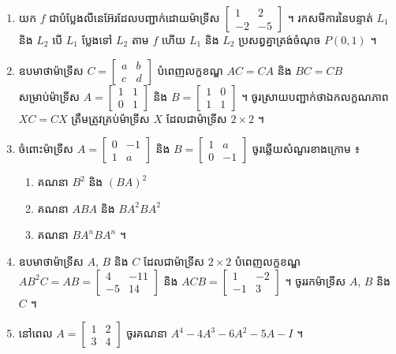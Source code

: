 \begin{enumerate}[1]
  \item យក $f$ ជាបំប្លែងលីនេអ៊ែរដែលបញ្ជាក់ដោយម៉ាទ្រីស $\begin{bmatrix} 1 & 2\\ -2 & -5 \end{bmatrix}$ ។ រកសមីការនៃបន្ទាត់ $L_1$ និង $L_2$ បើ $L_1$ ប្លែងទៅ $L_2$ តាម $f$ ហើយ $L_1$ និង $L_2$ ប្រសព្វគ្នាត្រង់ចំណុច $P(0, 1)$ ។
  \item ឧបមាថាម៉ាទ្រីស $C = \begin{bmatrix} a & b\\ c & d \end{bmatrix}$ បំពេញលក្ខខណ្ឌ $AC = CA$ និង $BC = CB$ សម្រាប់ម៉ាទ្រីស $A = \begin{bmatrix} 1 & 1\\ 0 & 1 \end{bmatrix}$ និង $B = \begin{bmatrix} 1 & 0\\ 1 & 1 \end{bmatrix}$ ។ ចូរស្រាយបញ្ជាក់ថាឯកលក្ខណភាព $XC = CX$ ត្រឹមត្រូវគ្រប់ម៉ាទ្រីស $X$ ដែលជាម៉ាទ្រីស $2\times 2$ ។
  \item ចំពោះម៉ាទ្រីស $A = \begin{bmatrix} 0 & -1\\ 1 & a \end{bmatrix}$ និង $B = \begin{bmatrix} 1 & a\\ 0 & -1 \end{bmatrix}$ ចូរឆ្លើយសំណួរខាងក្រោម ៖
  \begin{enumerate}[a]
    \item គណនា $B^2$ និង $(BA)^2$
    \item គណនា $ABA$ និង $BA^2BA^2$
    \item គណនា $BA^nBA^n$ ។
  \end{enumerate}
  \item ឧបមាថាម៉ាទ្រីស $A$, $B$ និង $C$ ដែលជាម៉ាទ្រីស $2\times 2$ បំពេញលក្ខខណ្ឌ $AB^2C = AB = \begin{bmatrix} 4 & -11\\ -5 & 14 \end{bmatrix}$ និង $ACB = \begin{bmatrix} 1 & -2\\ -1 & 3 \end{bmatrix}$ ។ ចូររកម៉ាទ្រីស $A$, $B$ និង $C$ ។
  \item នៅពេល $A = \begin{bmatrix} 1 & 2\\ 3 & 4 \end{bmatrix}$ ចូរគណនា $A^4 - 4A^3 - 6A^2 - 5A - I$ ។

\end{enumerate}
